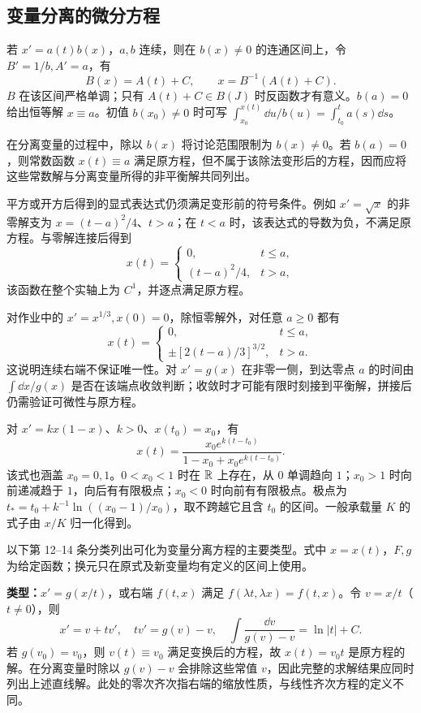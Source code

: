 \subsection{变量分离的微分方程}
若 $x'=a(t)b(x)$，$a,b$ 连续，则在 $b(x)\ne0$ 的连通区间上，令 $B'=1/b,A'=a$，有
\[
B(x)=A(t)+C,\qquad x=B^{-1}(A(t)+C).
\]
$B$ 在该区间严格单调；只有 $A(t)+C\in B(J)$ 时反函数才有意义。$b(a)=0$ 给出恒等解 $x\equiv a$。初值 $b(x_0)\ne0$ 时可写 $\int_{x_0}^{x(t)}\!\dd u/b(u)=\int_{t_0}^t a(s)\dd s$。

\core 在分离变量的过程中，除以 $b(x)$ 将讨论范围限制为 $b(x)\ne0$。若 $b(a)=0$，则常数函数 $x(t)\equiv a$ 满足原方程，但不属于该除法变形后的方程，因而应将这些常数解与分离变量所得的非平衡解共同列出。

平方或开方后得到的显式表达式仍须满足变形前的符号条件。例如 $x'=\sqrt{x}$ 的非零解支为 $x=(t-a)^2/4$、$t>a$；在 $t<a$ 时，该表达式的导数为负，不满足原方程。与零解连接后得到
\[
x(t)=\begin{cases}0,&t\le a,\\(t-a)^2/4,&t>a,\end{cases}
\]
该函数在整个实轴上为 $C^1$，并逐点满足原方程。

对作业中的 $x'=x^{1/3},x(0)=0$，除恒零解外，对任意 $a\ge0$ 都有
\[
x(t)=\begin{cases}0,&t\le a,\\ \displaystyle\pm[2(t-a)/3]^{3/2},&t>a.\end{cases}
\]
这说明连续右端不保证唯一性。对 $x'=g(x)$ 在非零一侧，到达零点 $a$ 的时间由 $\int\!\dd x/g(x)$ 是否在该端点收敛判断；收敛时才可能有限时刻接到平衡解，拼接后仍需验证可微性与原方程。

对 $x'=kx(1-x)$、$k>0$、$x(t_0)=x_0$，有
\[
x(t)=\frac{x_0e^{k(t-t_0)}}{1-x_0+x_0e^{k(t-t_0)}}.
\]
该式也涵盖 $x_0=0,1$。$0<x_0<1$ 时在 $\mathbb R$ 上存在，从 $0$ 单调趋向 $1$；$x_0>1$ 时向前递减趋于 $1$，向后有有限极点；$x_0<0$ 时向前有有限极点。极点为 $t_*=t_0+k^{-1}\ln((x_0-1)/x_0)$，取不跨越它且含 $t_0$ 的区间。一般承载量 $K$ 的式子由 $x/K$ 归一化得到。

\core 以下第 12--14 条分类列出可化为变量分离方程的主要类型。式中 $x=x(t)$，$F,g$ 为给定函数；换元只在原式及新变量均有定义的区间上使用。

\textbf{类型：}$x'=g(x/t)$，或右端 $f(t,x)$ 满足 $f(\lambda t,\lambda x)=f(t,x)$。令 $v=x/t$（$t\ne0$），则
\[
x'=v+tv',\quad tv'=g(v)-v,\quad
\int\frac{\dd v}{g(v)-v}=\ln|t|+C.
\]
若 $g(v_0)=v_0$，则 $v(t)\equiv v_0$ 满足变换后的方程，故 $x(t)=v_0t$ 是原方程的解。在分离变量时除以 $g(v)-v$ 会排除这些常值 $v$，因此完整的求解结果应同时列出上述直线解。此处的零次齐次指右端的缩放性质，与线性齐次方程的定义不同。

